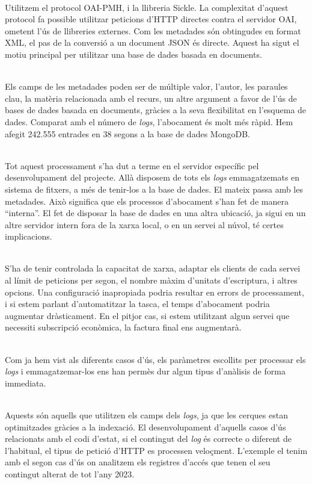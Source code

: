 \noindent \\
Utilitzem el protocol OAI-PMH, i la llibreria Sickle.
La complexitat d'aquest protocol fa possible utilitzar peticions d'\gls{HTTP} directes contra el servidor OAI, ometent l'ús de llibreries externes.
Com les metadades són obtingudes en format XML, el pas de la conversió a un document JSON és directe.
Aquest ha sigut el motiu principal per utilitzar una base de dades basada en documents.

\noindent \\
Els camps de les metadades poden ser de múltiple valor, l’autor, les paraules clau, la matèria relacionada amb el recurs, un altre argument a favor de l’ús de bases de dades basada en documents, gràcies a la seva flexibilitat en l’esquema de dades.
Comparat amb el número de \textit{\gls{log}s}, l'abocament és molt més ràpid.
Hem afegit 242.555 entrades en 38 segons a la base de dades MongoDB.

\noindent \\
Tot aquest processament s'ha dut a terme en el servidor específic pel desenvolupament del projecte.
Allà disposem de tots els \textit{\gls{log}s} emmagatzemats en sistema de fitxers, a més de tenir-los a la base de dades.
El mateix passa amb les metadades.
Això significa que els processos d'abocament s'han fet de manera “interna”.
El fet de disposar la base de dades en una altra ubicació, ja sigui en un altre servidor intern fora de la xarxa local, o en un servei al núvol, té certes implicacions.

\noindent \\
S'ha de tenir controlada la capacitat de xarxa, adaptar els clients de cada servei al límit de peticions per segon, el nombre màxim d'unitats d'escriptura, i altres opcions.
Una configuració inapropiada podria resultar en errors de processament, i si estem parlant d'automatitzar la tasca, el temps d'abocament podria augmentar dràsticament.
En el pitjor cas, si estem utilitzant algun servei que necessiti subscripció econòmica, la factura final ens augmentarà.

\noindent \\
Com ja hem vist als diferents casos d'ús, els paràmetres escollits per processar els \textit{\gls{log}s} i emmagatzemar-los ens han permès dur algun tipus d'anàlisis de forma immediata.

\noindent \\
Aquests són aquells que utilitzen els camps dels \textit{\gls{log}s}, ja que les cerques estan optimitzades gràcies a la indexació.
El desenvolupament d'aquells casos d'ús relacionats amb el codi d'estat, si el contingut del \textit{\gls{log}} és correcte o diferent de l'habitual, el tipus de petició d'\gls{HTTP} es processen veloçment.
L'exemple el tenim amb el segon cas d'ús on analitzem els registres d'accés que tenen el seu contingut alterat de tot l'any 2023.

